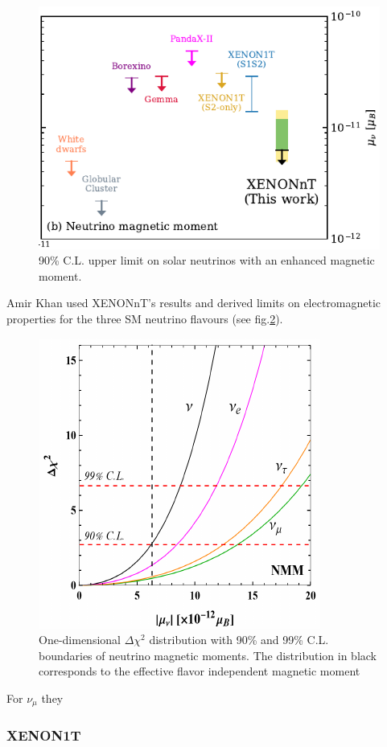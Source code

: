 \begin{figure}
    \centering
    \hspace*{1.5cm}\includegraphics[width=.7\textwidth]{Plots/XENONnTExpResultsComparison.pdf}
    \caption{90\% C.L. upper limit on solar neutrinos with an enhanced magnetic moment.}
    \label{fig:XENONnTResults}
\end{figure}
Amir Khan used\cite{Khan:2022bel} XENONnT's results and derived limits on electromagnetic properties for the three SM neutrino flavours (see fig.\ref{fig:XENONnTFit_Khan}).
\begin{figure}
    \centering
    \includegraphics[width=.65\textwidth]{Plots/XENONnTFitForNuMM_Khan.pdf}
    \caption{One-dimensional $\Delta\chi^2$ distribution with 90\% and 99\% C.L. boundaries of neutrino magnetic moments. The distribution in black corresponds to the effective flavor independent magnetic moment}
    \label{fig:XENONnTFit_Khan}
\end{figure}
For $\nu_\mu$ they 

\subsubsection{XENON1T}

